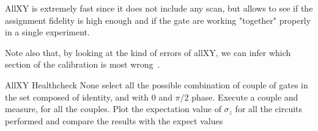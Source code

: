 AllXY is extremely fast since it does not include any scan, but allows to see if the assignment fidelity is high enough and if the gate are working "together" properly in a single experiment.

Note also that, by looking at the kind of errors of allXY, we can infer which section of the calibration is most wrong~\cite{Gao2021}.

\experimentrecap
{AllXY}
{Healthcheck}
{None}
{select all the possible combination of couple of gates in the set composed of identity, \pipulse and \pihpulse with 0 and $\pi/2$ phase.
Execute a couple and measure, for all the couples.
Plot the expectation value of $\sigma_z$ for all the circuits performed and compare the results with the expect values}